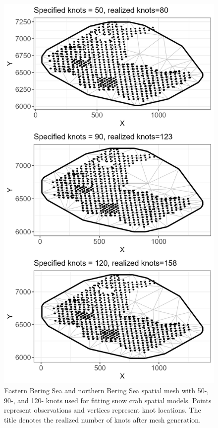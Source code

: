 \documentclass[
]{article}
\begin{document}
\begin{figure}

{\centering \includegraphics[width=0.75\linewidth,height=0.75\textheight]{../SNOW/Figures/snow_EBS-NBS_mesh} 

}

\caption{Eastern Bering Sea and northern Bering Sea spatial mesh with 50-, 90-, and 120- knots used for fitting snow crab spatial models. Points represent observations and vertices represent knot locations. The title denotes the realized number of knots after mesh generation.}\label{fig:snow-NBS-mesh}
\end{figure}
\end{document}
